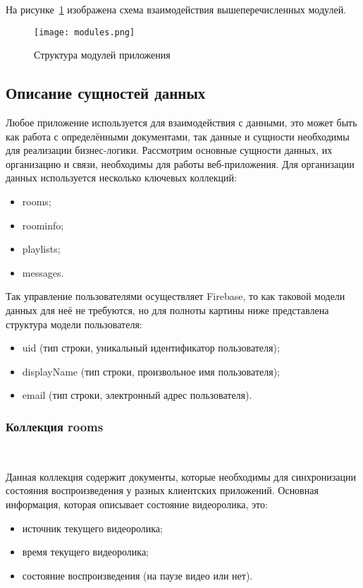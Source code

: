 На рисунке~\ref{fig:arch:modules_scheme} изображена схема взаимодействия вышеперечисленных модулей.
 
\begin{figure}[H]
 \centering
   \texttt{[image: modules.png]} 
   \caption{Структура модулей приложения}
   \label{fig:arch:modules_scheme}
\end{figure}
 
\subsection{Описание сущностей данных}
Любое приложение используется для взаимодействия с данными, это может быть как работа с определёнными документами, так данные и сущности необходимы для реализации бизнес-логики.
Рассмотрим основные сущности данных, их организацию и связи, необходимы для работы веб-приложения. Для организации данных используется несколько ключевых коллекций:
\begin{itemize}
 \item rooms;
 \item roominfo;
 \item playlists;
 \item messages.
\end{itemize}
 
Так управление пользователями осуществляет Firebase, то как таковой модели данных для неё не требуются, но для полноты картины ниже представлена структура модели пользователя:
\begin{itemize}
 \item uid (тип строки, уникальный идентификатор пользователя);
 \item displayName (тип строки, произвольное имя пользователя);
 \item email (тип строки, электронный адрес пользователя).
\end{itemize}
 
\subsubsection{Коллекция rooms}~\par
Данная коллекция содержит документы, которые необходимы для синхронизации состояния воспроизведения у разных клиентских приложений. Основная информация, которая описывает состояние видеоролика, это:
\begin{itemize}
 \item источник текущего видеоролика;
 \item время текущего видеоролика;
 \item состояние воспроизведения (на паузе видео или нет).
\end{itemize}
 
